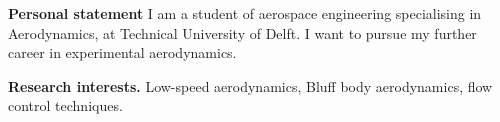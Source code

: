 %
%

\par{
{\textbf{Personal statement}} 
I am a student of aerospace engineering specialising in Aerodynamics, at Technical University of Delft. I want to pursue my further career in experimental aerodynamics.   

{\textbf{Research interests.}} 
Low-speed aerodynamics, Bluff body aerodynamics, flow control techniques. 
}